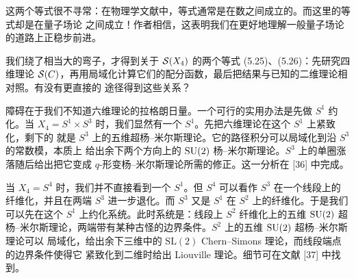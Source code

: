 这两个等式很不寻常：在物理学文献中，等式通常是在数之间成立的。而这里的等式却是在量子场论
之间成立！作者相信，这表明我们在更好地理解一般量子场论的道路上正稳步前进。


我们绕了相当大的弯子，才得到关于 $\mathcal{S}(X_4)$ 的两个等式 (5.25)、(5.26)：先研究四维理论
$\mathcal{S}(C)$，再用局域化计算它们的配分函数，最后把结果与已知的二维理论相对照。有没有更直接的
途径得到这些关系？

障碍在于我们不知道六维理论的拉格朗日量。一个可行的实用办法是先做 $S^1$ 约化。当
$X_4=S^1\times S^3$ 时，我们显然有一个 $S^1$。先把六维理论在这个 $S^1$ 上紧致化，剩下的
就是 $S^3$ 上的五维超杨--米尔斯理论。它的路径积分可以局域化到沿 $S^3$ 的常数模，本质上
给出余下两个方向上的 $\mathrm{SU}(2)$ 杨--米尔斯理论。$S^3$ 上的单圈涨落随后给出把它变成
$q$-形变杨--米尔斯理论所需的修正。这一分析在 [36] 中完成。


当 $X_4=S^4$ 时，我们并不直接看到一个 $S^1$。但 $S^4$ 可以看作 $S^3$ 在一个线段上的
纤维化，并且在两端 $S^3$ 进一步退化。而 $S^3$ 又是 $S^1$ 在 $S^2$ 上的纤维化。于是我们
可以先在这个 $S^1$ 上约化系统。此时系统是：线段上 $S^2$ 纤维化上的五维 $\mathrm{SU}(2)$ 超
杨--米尔斯理论，两端带有某种古怪的边界条件。$S^2$ 上的五维 $\mathrm{SU}(2)$ 超杨--米尔斯理论可以
局域化，给出余下三维中的 $\mathrm{SL}(2)$ Chern--Simons 理论，而线段端点的边界条件使得它
紧致化到二维时给出 Liouville 理论。细节可在文献 [37] 中找到。


